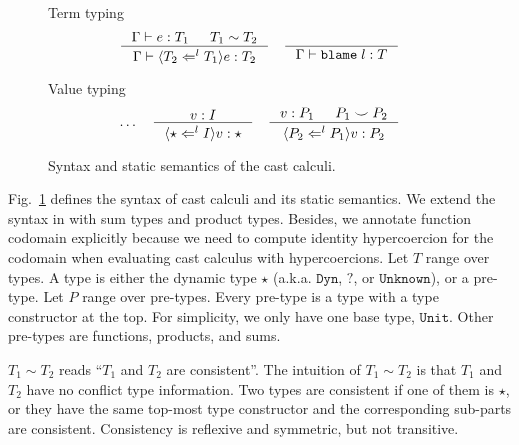 \documentclass[acmsmall,review,anonymous]{acmart}\settopmatter{printfolios=true,printccs=false,printacmref=false}
\newcommand{\figref}[1]{Fig.~\ref{#1}}
\newcommand{\judgetype}[3]{#1 \vdash #2 : #3}
\newcommand{\TOOdyn}[0]{\star}
\newcommand{\POOunit}[0]{\mathtt{Unit}}
\newcommand{\eOOcast}[4]{\langle \cOOcast{#2}{#3}{#4} \rangle #1}
\newcommand{\eOOblame}[1]{\mathtt{blame} \; #1}
\newcommand{\cOOcast}[3]{#3 \Leftarrow^{#2} #1}
\newcommand{\vOOcast}[2]{\langle#2\rangle#1}
\begin{document}
\begin{figure}
	Term typing
	\fbox{$ \judgetype{\Gamma}{e}{T} $}
	\begin{gather*}
		\inference{
			\Gamma \vdash e : T_1 & T_1 \sim T_2
		}{
			\judgetype{\Gamma}{\eOOcast{e}{T_1}{l}{T_2}}{T_2}
		} \quad
		\inference{
		}{
			\judgetype{\Gamma}{\eOOblame{l}}{T}
		}
	\end{gather*}
	
	Value typing 
	\begin{gather*}
	\dots \quad
	\inference{
		v : I
	}{
		\vOOcast{v}{\cOOcast{I}{l}{\TOOdyn}} : \TOOdyn
	}
	\quad
	\inference{
		v : P_1 &
		P_1 \smile P_2
	}{
		\vOOcast{v}{\cOOcast{P_1}{l}{P_2}} : P_2
	}
	\end{gather*}

	\caption{Syntax and static semantics of the cast calculi.}
	\label{fig:blame-static}
\end{figure}

\figref{fig:blame-static} defines the syntax of cast calculi and its
static semantics. We extend the syntax in \citet{siek2009exploring} with sum 
types and product types. Besides, we annotate function codomain explicitly 
because we need to compute identity hypercoercion for the codomain when 
evaluating cast calculus with hypercoercions.
Let $ T $ range over types. A type is either the dynamic type $ \star $
(a.k.a. $ \mathtt{Dyn} $, $ \mathbb{?} $, or $ \mathtt{Unknown} $), 
or a pre-type. 
Let $ P $ range over pre-types. Every pre-type is a type with a type 
constructor at the top. For simplicity, we only have one base type, $ \POOunit 
$. 
Other pre-types are functions, products, and sums.

$ T_1 \sim T_2 $ reads ``$ T_1 $ and $ T_2 $ are consistent''.
The intuition of $ T_1 \sim T_2 $ is that $ T_1 $ and $ T_2 $ have no conflict 
type information. Two types are consistent if one of them is $ \star $, or they 
have the same top-most type constructor and the corresponding sub-parts are 
consistent. Consistency is reflexive and symmetric, but not transitive.
\end{document}
